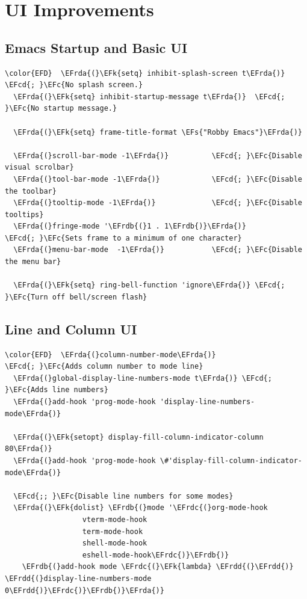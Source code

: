 \documentclass[11pt]{article}
\newcommand{\EFc}[1]{\textcolor{EFc}{#1}} %
\newcommand{\EFcd}[1]{\textcolor{EFcd}{#1}} %
\newcommand{\EFs}[1]{\textcolor{EFs}{#1}} %
\newcommand{\EFk}[1]{\textcolor{EFk}{#1}} %
\newcommand{\EFrda}[1]{\textcolor{EFrda}{#1}} %
\newcommand{\EFrdb}[1]{\textcolor{EFrdb}{#1}} %
\newcommand{\EFrdc}[1]{\textcolor{EFrdc}{#1}} %
\newcommand{\EFrdd}[1]{\textcolor{EFrdd}{#1}} %
\begin{document}
\section{UI Improvements}
\label{sec:org038c1b5}
\subsection{Emacs Startup and Basic UI}
\label{sec:org2e445d7}
\begin{Code}
\begin{Verbatim}
\color{EFD}  \EFrda{(}\EFk{setq} inhibit-splash-screen t\EFrda{)}    \EFcd{; }\EFc{No splash screen.}
  \EFrda{(}\EFk{setq} inhibit-startup-message t\EFrda{)}  \EFcd{; }\EFc{No startup message.}

  \EFrda{(}\EFk{setq} frame-title-format \EFs{"Robby Emacs"}\EFrda{)}

  \EFrda{(}scroll-bar-mode -1\EFrda{)}          \EFcd{; }\EFc{Disable visual scrolbar}
  \EFrda{(}tool-bar-mode -1\EFrda{)}            \EFcd{; }\EFc{Disable the toolbar}
  \EFrda{(}tooltip-mode -1\EFrda{)}             \EFcd{; }\EFc{Disable tooltips}
  \EFrda{(}fringe-mode '\EFrdb{(}1 . 1\EFrdb{)}\EFrda{)}        \EFcd{; }\EFc{Sets frame to a minimum of one character}
  \EFrda{(}menu-bar-mode  -1\EFrda{)}           \EFcd{; }\EFc{Disable the menu bar}

  \EFrda{(}\EFk{setq} ring-bell-function 'ignore\EFrda{)} \EFcd{; }\EFc{Turn off bell/screen flash}
\end{Verbatim}
\end{Code}

\subsection{Line and Column UI}
\label{sec:orgb1223da}
\begin{Code}
\begin{Verbatim}
\color{EFD}  \EFrda{(}column-number-mode\EFrda{)}                 \EFcd{; }\EFc{Adds column number to mode line}
  \EFrda{(}global-display-line-numbers-mode t\EFrda{)} \EFcd{; }\EFc{Adds line numbers}
  \EFrda{(}add-hook 'prog-mode-hook 'display-line-numbers-mode\EFrda{)}

  \EFrda{(}\EFk{setopt} display-fill-column-indicator-column 80\EFrda{)}
  \EFrda{(}add-hook 'prog-mode-hook \#'display-fill-column-indicator-mode\EFrda{)}

  \EFcd{;; }\EFc{Disable line numbers for some modes}
  \EFrda{(}\EFk{dolist} \EFrdb{(}mode '\EFrdc{(}org-mode-hook
                  vterm-mode-hook
                  term-mode-hook
                  shell-mode-hook
                  eshell-mode-hook\EFrdc{)}\EFrdb{)}
    \EFrdb{(}add-hook mode \EFrdc{(}\EFk{lambda} \EFrdd{(}\EFrdd{)} \EFrdd{(}display-line-numbers-mode 0\EFrdd{)}\EFrdc{)}\EFrdb{)}\EFrda{)}
\end{Verbatim}
\end{Code}
\end{document}
